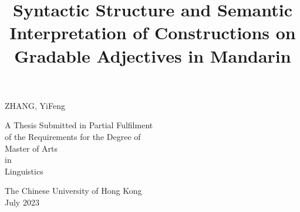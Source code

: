 \documentclass{ctexart}
\title{\LARGE{\bfseries{Syntactic Structure and Semantic Interpretation of Constructions on Gradable Adjectives in Mandarin}}}
\date{\vspace{-10ex}}
\begin{document}


{\let\newpage\relax\maketitle}

\vspace{10ex}

\begin{center}
\Large{ZHANG, YiFeng}
\end{center}

\vspace{25ex}

\begin{center}
    \Large{
        A Thesis Submitted in Partial Fulfilment \\
        of the Requirements for the Degree of \\
        Master of Arts \\
        in \\
        Linguistics
        }
\end{center}

\vspace{20ex}

\begin{center}
    \Large{
        The Chinese University of Hong Kong \\
        July 2023
        }
\end{center}

\thispagestyle{empty} %

\newpage
\end{document}
